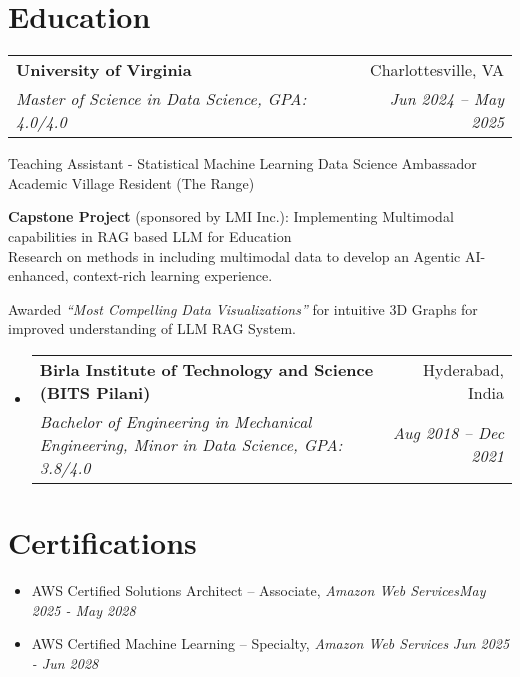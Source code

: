 \documentclass[letterpaper,11pt]{article}
\makeatletter
\newcommand{\resumeItem}[1]{
\justifying
  \item{\small{#1}}
  \vspace{-2px}
}
\newcommand{\resumeSubheading}[4]{
  \item
    \begin{tabular*}{1\textwidth}{l@{\extracolsep{\fill}}r}
      \textbf{\large{#1}} & {\small{#2}} \\
      {\textsl{{#3}}} & {\textsl{\small{#4}}}
    \end{tabular*}
  \vspace{-0.5cm}
}
\newcommand{\resumeSubHeadingListStart}{\begin{itemize}[leftmargin=0.0in, label={}]}
\newcommand{\resumeSubHeadingListEnd}{\end{itemize}}
\newcommand{\resumeItemListStart}{
  \vspace{-5pt}
  \begin{itemize}[leftmargin=0.21in, label=\textbullet]
}
\newcommand{\resumeItemListEnd}{\end{itemize}}
\makeatother
\begin{document}
\vspace{-18pt}
\section{\Large{Education}}
\vspace{3pt}
\resumeSubHeadingListStart

\resumeSubheading
    {University of Virginia}{Charlottesville, VA}
    {Master of Science in Data Science, GPA: 4.0/4.0}{Jun 2024 -- May 2025}

\vspace{4px}
\footnotesize{
Teaching Assistant - Statistical Machine Learning {\textbullet}
Data Science Ambassador {\textbullet}
Academic Village Resident (The Range)
\vspace{-4px}
\resumeItem{\textbf{Capstone Project} (sponsored by LMI Inc.):  Implementing Multimodal capabilities in RAG based LLM for Education\\
 Research on methods in including multimodal data to develop an Agentic AI-enhanced, context-rich learning experience.
 }\vspace{-5px}
 \resumeItem{Awarded \textsl{“Most Compelling Data Visualizations”} for intuitive 3D Graphs for improved understanding of LLM RAG System.}




}



\resumeSubHeadingListEnd
\vspace{-3pt}
\resumeSubHeadingListStart
\resumeSubheading
    {Birla Institute of Technology and Science \normalsize{(BITS Pilani)}}{Hyderabad, India}
    {Bachelor of Engineering in Mechanical Engineering, Minor in Data Science, GPA: 3.8/4.0}{Aug 2018 -- Dec 2021}

\resumeSubHeadingListEnd




\vspace{-12pt}
\section{\Large{Certifications}}
\vspace{9pt}
\resumeItemListStart

\resumeItem{AWS Certified Solutions Architect – Associate, \textsl{Amazon Web Services}\hfill\sl{May 2025 - May 2028}}

\resumeItem{\vspace{-8pt}AWS Certified Machine Learning – Specialty, \textsl{Amazon Web Services} \hfill\sl{Jun 2025 - Jun 2028}}

\resumeItemListEnd
\end{document}
